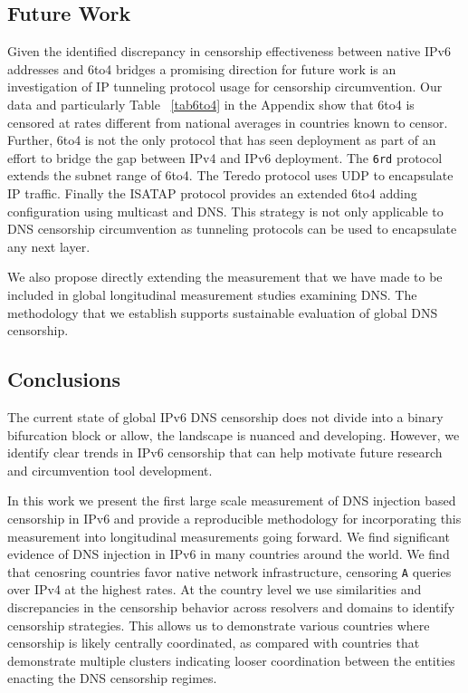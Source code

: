 
\subsection{Future Work}
\label{sec:discussion:future_work}

Given the identified discrepancy in censorship effectiveness between native IPv6
addresses and 6to4 bridges a promising direction for future work is an
investigation of IP tunneling protocol usage for censorship circumvention. Our
data and particularly Table ~\ref{tab6to4} in the Appendix show that 6to4 is
censored at rates different from national averages in countries known to censor.
Further, 6to4 is not the only protocol that has seen deployment as part of an
effort to bridge the gap between IPv4 and IPv6 deployment. The \texttt{6rd}
protocol extends the subnet range of 6to4. The Teredo protocol uses UDP to
encapsulate IP traffic. Finally the ISATAP protocol provides an extended 6to4
adding configuration using multicast and DNS. This strategy is not only
applicable to DNS censorship circumvention as tunneling protocols can be used to
encapsulate any next layer.


We also propose directly extending the measurement that we have made to be
included in global longitudinal measurement studies examining DNS. The
methodology that we establish supports sustainable evaluation of global DNS
censorship.

\subsection{Conclusions}

The current state of global IPv6 DNS censorship does not divide into a binary
bifurcation block or allow, the landscape is nuanced and developing. However, we
identify clear trends in IPv6 censorship that can help motivate future research
and circumvention tool development.

In this work we present the first large scale measurement of DNS injection based
censorship in IPv6 and provide a reproducible methodology for incorporating this
measurement into longitudinal measurements going forward. We find significant
evidence of DNS injection in IPv6 in many countries around the world. We find
that cenosring countries favor native network infrastructure, censoring
\texttt{A} queries over IPv4 at the highest rates. At the country level we use
similarities and discrepancies in the censorship behavior across resolvers and
domains to identify censorship strategies. This allows us to demonstrate various
countries where censorship is likely centrally coordinated, as compared with
countries that demonstrate multiple clusters indicating looser coordination
between the entities enacting the DNS censorship regimes.

